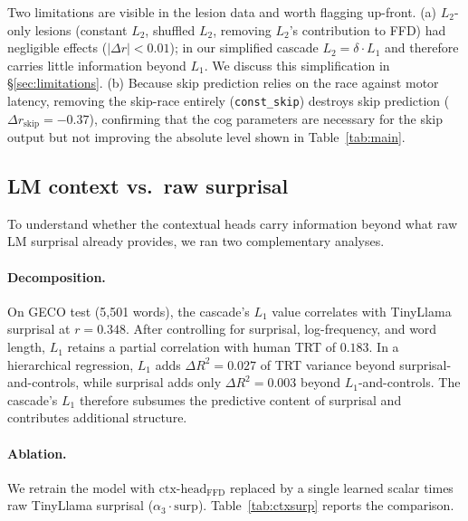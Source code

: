 \documentclass[11pt]{article}
\begin{document}
Two limitations are visible in the lesion data and worth flagging up-front. (a) $L_2$-only lesions (constant $L_2$, shuffled $L_2$, removing $L_2$'s contribution to FFD) had negligible effects ($|\Delta r| < 0.01$); in our simplified cascade $L_2 = \delta \cdot L_1$ and therefore carries little information beyond $L_1$. We discuss this simplification in \S\ref{sec:limitations}. (b) Because skip prediction relies on the race against motor latency, removing the skip-race entirely (\texttt{const\_skip}) destroys skip prediction ($\Delta r_{\text{skip}} = -0.37$), confirming that the cog parameters are necessary for the skip output but not improving the absolute level shown in Table~\ref{tab:main}.

\subsection{LM context vs.\ raw surprisal}\label{sec:ctxsurp}

To understand whether the contextual heads carry information beyond what raw LM surprisal already provides, we ran two complementary analyses.

\paragraph{Decomposition.} On GECO test (5{,}501 words), the cascade's $L_1$ value correlates with TinyLlama surprisal at $r = 0.348$. After controlling for surprisal, log-frequency, and word length, $L_1$ retains a partial correlation with human TRT of $0.183$. In a hierarchical regression, $L_1$ adds $\Delta R^2 = 0.027$ of TRT variance beyond surprisal-and-controls, while surprisal adds only $\Delta R^2 = 0.003$ beyond $L_1$-and-controls. The cascade's $L_1$ therefore subsumes the predictive content of surprisal and contributes additional structure.

\paragraph{Ablation.} We retrain the model with $\mathrm{ctx\text{-}head}_{\text{FFD}}$ replaced by a single learned scalar times raw TinyLlama surprisal ($\alpha_3 \cdot \text{surp}$). Table~\ref{tab:ctxsurp} reports the comparison.
\end{document}
